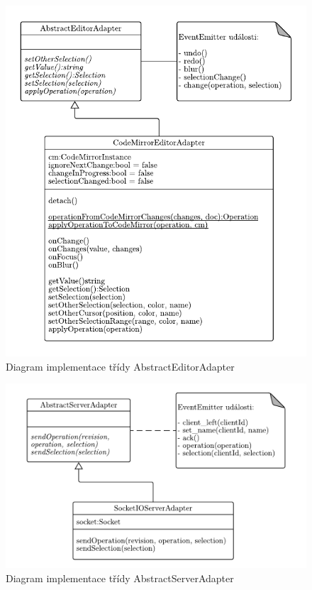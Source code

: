 \begin{figure}[ht!]
    \centering
    \includegraphics[width=\textwidth]{partials/navrh/AbstractEditorAdapter.pdf}
    \caption{Diagram implementace třídy AbstractEditorAdapter}\label{fig:AbstractEditorAdapter}
\end{figure}

\begin{figure}[ht!]
    \centering
    \includegraphics[width=\textwidth]{partials/navrh/AbstractServerAdapter.pdf}
    \caption{Diagram implementace třídy AbstractServerAdapter}\label{fig:AbstractServerAdapter}
\end{figure}

